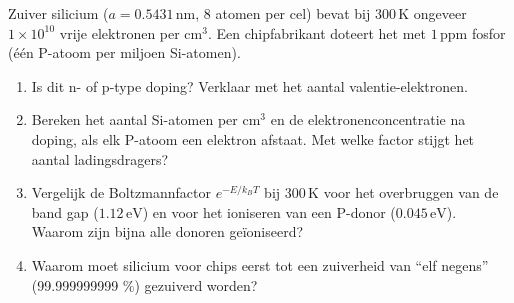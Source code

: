 \begin{oefening}
Zuiver silicium (\(a = 0.5431\,\mathrm{nm}\), 8 atomen per cel) bevat bij \(300\,\mathrm{K}\) ongeveer \(1\times10^{10}\) vrije elektronen per cm\ensuremath{^{3}}. Een chipfabrikant doteert het met \(1\,\mathrm{ppm}\) fosfor (één P-atoom per miljoen Si-atomen).

\begin{enumerate}
\item[(a)]
  Is dit n- of p-type doping? Verklaar met het aantal valentie-elektronen.
\item[(b)]
  Bereken het aantal Si-atomen per cm\ensuremath{^{3}} en de elektronenconcentratie na doping, als elk P-atoom een elektron afstaat. Met welke factor stijgt het aantal ladingsdragers?
\item[(c)]
  Vergelijk de Boltzmannfactor \(e^{-E/k_BT}\) bij \(300\,\mathrm{K}\) voor het overbruggen van de band gap (\(1.12\,\mathrm{eV}\)) en voor het ioniseren van een P-donor (\(0.045\,\mathrm{eV}\)). Waarom zijn bijna alle donoren geïoniseerd?
\item[(d)]
  Waarom moet silicium voor chips eerst tot een zuiverheid van ``elf negens'' (99.999999999 \%) gezuiverd worden?
\end{enumerate}
\end{oefening}
